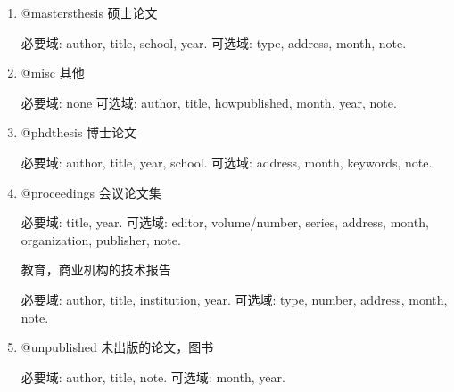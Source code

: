 \documentclass{bjfu}
\begin{document}
\begin{enumerate}[labelsep = .5em, leftmargin = 0pt, itemindent = 3em]
    \item @mastersthesis
    硕士论文
    
    \setlength{\parindent}{2em}必要域: author, title, school, year.
    可选域: type, address, month, note.
    
    \item @misc
    其他
    
    \setlength{\parindent}{2em}必要域: none
    可选域: author, title, howpublished, month, year, note.
    
    \item @phdthesis
    博士论文
    
    \setlength{\parindent}{2em}必要域: author, title, year, school.
    可选域: address, month, keywords, note.
    
    \item @proceedings
    会议论文集
    
    \setlength{\parindent}{2em}必要域: title, year.
    可选域: editor, volume/number, series, address, month, organization, publisher, note.
    
    \item@techreport
    教育，商业机构的技术报告
    
    \setlength{\parindent}{2em}必要域: author, title, institution, year.
    可选域: type, number, address, month, note.
    
    \item @unpublished
    未出版的论文，图书
    
    \setlength{\parindent}{2em}必要域: author, title, note.
    可选域: month, year.
\end{enumerate}
\end{document}
